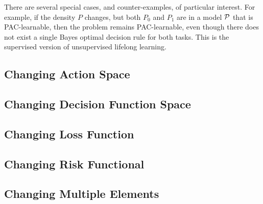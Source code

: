 \documentclass{article}
\begin{document}
There are several special cases, and counter-examples, of particular interest.  For example, if the density $P$ changes, but both $P_0$ and $P_1$ are in a model $\mathcal{P}$ that is PAC-learnable, then the problem remains PAC-learnable, even though there does not exist a single Bayes optimal decision rule for both tasks. This is the supervised version of unsupervised lifelong learning.  



\subsection{Changing Action Space}

\subsection{Changing Decision Function Space}

\subsection{Changing Loss Function}

\subsection{Changing Risk Functional}

\subsection{Changing Multiple Elements}

\end{document}
